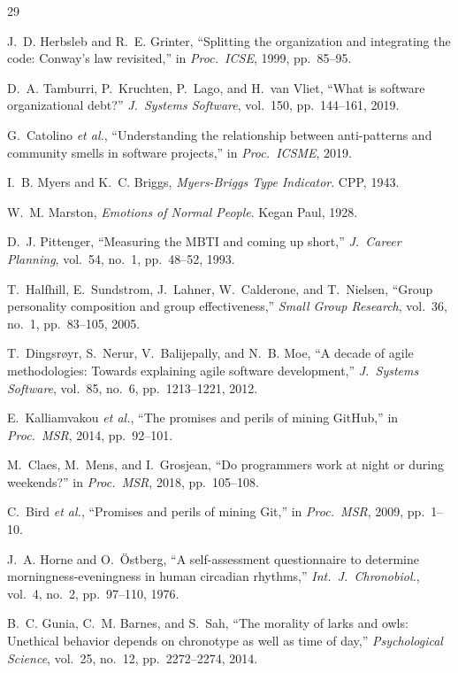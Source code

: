 \documentclass[conference]{IEEEtran}
\begin{document}
\begin{thebibliography}{29}

J.~D. Herbsleb and R.~E. Grinter, ``Splitting the organization and
integrating the code: Conway's law revisited,'' in \textit{Proc.\
ICSE}, 1999, pp.~85--95.

D.~A. Tamburri, P.~Kruchten, P.~Lago, and H.~van Vliet, ``What is
software organizational debt?'' \textit{J.\ Systems Software},
vol.~150, pp.~144--161, 2019.

G.~Catolino \textit{et al.}, ``Understanding the relationship between
anti-patterns and community smells in software projects,'' in
\textit{Proc.\ ICSME}, 2019.

I.~B. Myers and K.~C. Briggs, \textit{Myers-Briggs Type Indicator}.
CPP, 1943.

W.~M. Marston, \textit{Emotions of Normal People}. Kegan Paul, 1928.

D.~J. Pittenger, ``Measuring the MBTI and coming up short,''
\textit{J.\ Career Planning}, vol.~54, no.~1, pp.~48--52, 1993.

T.~Halfhill, E.~Sundstrom, J.~Lahner, W.~Calderone, and T.~Nielsen,
``Group personality composition and group effectiveness,''
\textit{Small Group Research}, vol.~36, no.~1, pp.~83--105, 2005.

T.~Dingsr\o{}yr, S.~Nerur, V.~Balijepally, and N.~B. Moe,
``A decade of agile methodologies: Towards explaining agile software
development,'' \textit{J.\ Systems Software}, vol.~85, no.~6,
pp.~1213--1221, 2012.

E.~Kalliamvakou \textit{et al.}, ``The promises and perils of mining
GitHub,'' in \textit{Proc.\ MSR}, 2014, pp.~92--101.

M.~Claes, M.~Mens, and I.~Grosjean, ``Do programmers work at night
or during weekends?'' in \textit{Proc.\ MSR}, 2018, pp.~105--108.

C.~Bird \textit{et al.}, ``Promises and perils of mining Git,'' in
\textit{Proc.\ MSR}, 2009, pp.~1--10.

J.~A. Horne and O.~\"{O}stberg, ``A self-assessment questionnaire to
determine morningness-eveningness in human circadian rhythms,''
\textit{Int.\ J.\ Chronobiol.}, vol.~4, no.~2, pp.~97--110, 1976.

B.~C. Gunia, C.~M. Barnes, and S.~Sah, ``The morality of larks and
owls: Unethical behavior depends on chronotype as well as time of
day,'' \textit{Psychological Science}, vol.~25, no.~12,
pp.~2272--2274, 2014.


\end{thebibliography}
\end{document}
